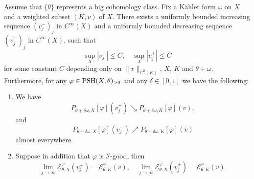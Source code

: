 \begin{lemma}\label{lma:global_env_approx} 
    Assume that $\{\theta\}$ represents a big cohomology class.
    Fix a Kähler form $\omega$ on $X$ and a weighted subset $(K,v)$ of $X$. There exists a uniformly bounded increasing sequence $(v^-_j)_j$ in $C^\infty(X)$ and a uniformly bounded decreasing sequence $(v^+_j)_j$ in $C^\infty(X)$, such that
    \begin{equation}\label{eq:unf_bd_vj}
    \sup_X |v_j^-|\leq C,\quad \sup_X |v_j^+|\leq C
    \end{equation}
    for some constant $C$ depending only on $\|v\|_{C^0(K)}$, $X$, $K$ and $\theta+\omega$. Furthermore, for any $\varphi \in \mathrm{PSH}(X,\theta)_{>0}$ and any $\delta\in [0,1]$ we have the following:
\begin{enumerate}
    \item\label{itm:lma:global_env_approx:1} We have
    \[
    P_{\theta+\delta \omega,X}[\varphi](v_j^+) \searrow P_{\theta+\delta \omega,K}[\varphi](v),
    \]
    and
    \[
    P_{\theta+\delta \omega,X}[\varphi](v^-_j) \nearrow P_{\theta+\delta \omega,K}[\varphi](v)
    \]
    almost everywhere.
    \item\label{itm:lma:global_env_approx:2} Suppose in addition that $\varphi$ is $\mathcal{I}$-good, then
    \[
        \lim_{j\to\infty}\mathcal{E}_{\theta,X}^{\varphi}(v_j^-)=\mathcal{E}_{\theta,K}^{\varphi}(v),\quad \lim_{j\to\infty}\mathcal{E}_{\theta,X}^{\varphi}(v_j^+)=\mathcal{E}_{\theta,K}^{\varphi}(v).
    \]
\end{enumerate}
\end{lemma}
